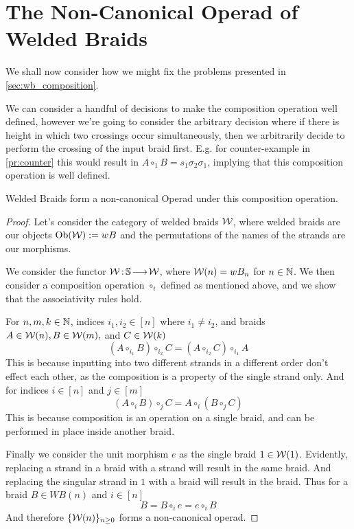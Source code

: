 \section{The Non-Canonical Operad of Welded Braids}

We shall now consider how we might fix the problems presented in \cref{sec:wb_composition}.

We can consider a handful of decisions to make the composition operation well defined, however we're going to consider the arbitrary decision where if there is height in which two crossings occur simultaneously, then we arbitrarily decide to perform the crossing of the input braid first. 
E.g. for counter-example in \cref{pr:counter} this would result in \( A \circ_1 B = s_1\sigma_2\sigma_1 \), implying that this composition operation is well defined. 

\begin{Theorem}
    Welded Braids form a non-canonical Operad under this composition operation. 
\end{Theorem}

\begin{proof}
Let's consider the category of welded braids \( \mathcal{W} \), where welded braids are our objects \( \operatorname{\text{Ob}}(\mathcal{W}) := wB \) and the permutations of the names of the strands are our morphisms. 

We consider the functor \( \mathcal{W} \,{:}\,\mathbb{S}\!\longrightarrow\!\mathcal{W} \), where \( \mathcal{W}(n) = wB_n \) for \( n \in \mathbb{N} \). 
We then consider a composition operation \( \circ_i \) defined as mentioned above, and we show that the associativity rules hold.

For \( n, m, k \in \mathbb{N} \), indices \( i_1, i_2 \in [n] \) where \( i_1 \neq i_2 \), and braids \( A \in \mathcal{W}(n), B \in \mathcal{W}(m), \) and \( C \in \mathcal{W}(k) \)
\[ (A \circ_{i_1} B) \circ_{i_2} C = (A \circ_{i_2} C) \circ_{i_1} A \]
This is because inputting into two different strands in a different order don't effect each other, as the composition is a property of the single strand only. 
And for indices \( i \in [n] \) and \( j \in [m] \)
\[ (A \circ_i B) \circ_j C = A \circ_i (B \circ_j C) \]
This is because composition is an operation on a single braid, and can be performed in place inside another braid. 

Finally we consider the unit morphism \( e \) as the single braid \( 1 \in \mathcal{W}(1) \). 
Evidently, replacing a strand in a braid with a strand will result in the same braid. 
And replacing the singular strand in \( 1 \) with a braid will result in the braid. 
Thus for a braid \( B \in WB(n) \) and \( i \in [n] \)
\[ B = B \circ_i e = e \circ_i B \]
And therefore \( \{ \mathcal{W}(n) \}_{n \ge 0} \) forms a non-canonical operad. 
\end{proof}

